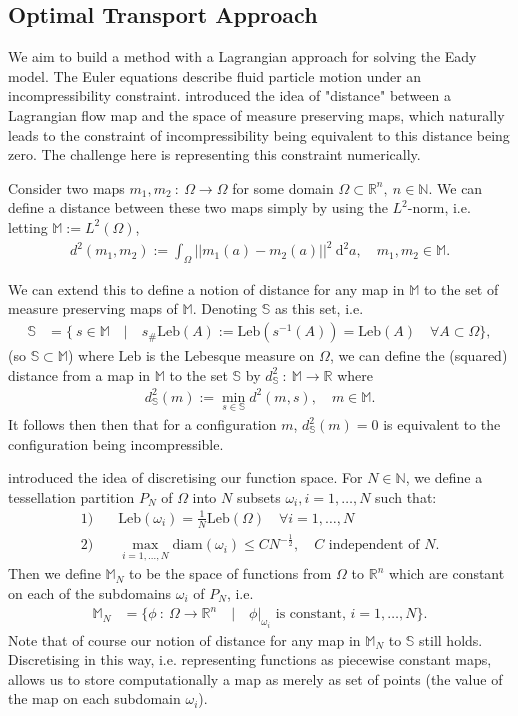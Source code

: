 \documentclass[11pt, oneside]{article}   	%
\newcommand{\R}{\mathbb{R}}
\newcommand{\MN}{\mathbb{M}_N}
\newcommand{\dsmsq}{d^{2}_{\mathbb{S}}(m)}
\newcommand{\M}{\mathbb{M}}
\newcommand{\N}{\mathbb{N}}
\newcommand{\Sb}{\mathbb{S}}
\newcommand{\Leb}{\mathrm{Leb}}
\begin{document}
\subsection{Optimal Transport Approach}

We aim to build a method with a Lagrangian approach for solving the Eady model. The Euler equations describe fluid particle motion under an incompressibility constraint. \cite{brenier1989least} introduced the idea of "distance" between a Lagrangian flow map and the space of measure preserving maps, which naturally leads to the constraint of incompressibility being equivalent to this distance being zero. The challenge here is representing this constraint numerically.

Consider two maps \(m_1, m_2 \: : \: \Omega \to \Omega\) for some domain \(\Omega \subset \R^n, \: n \in \N\). We can define a distance between these two maps simply by using the \(L^2\)-norm, i.e. letting \(\M := L^2(\Omega)\), 
\begin{align}
d^2(m_1, m_2) := \int_\Omega || m_1(a) - m_2(a) ||^2 \: \mathrm{d}^2 a, \quad m_1, m_2 \in \M.
\end{align}

We can extend this to define a notion of distance for any map in \(\M\) to the set of measure preserving maps of \(\M\). Denoting \(\Sb\) as this set, i.e. 
\begin{align}
\Sb &= \{ \: s \in \M \quad | \quad s_{\#}\Leb(A) := \Leb(s^{-1}(A)) = \Leb(A) \quad \forall A \subset \Omega \},
\end{align}
(so \(\Sb \subset \M\)) where \(\Leb\) is the Lebesque measure on \(\Omega\), we can define the (squared) distance from a map in \(\M\) to the set \(\Sb\) by \(d^2_\Sb \: : \: \M \to \R\) where
\begin{align}
\dsmsq := \min_{s \in \mathbb{S}} d^2(m, s), \quad m \in \M.
\end{align}
It follows then then that for a configuration \(m\), \(\dsmsq = 0\) is equivalent to the configuration being incompressible.

\cite{gallouet2016lagrangian} introduced the idea of discretising our function space. For \(N \in \N\), we define a tessellation partition \(P_N\) of \(\Omega\) into \(N\) subsets \(\omega_i, i=1,\dots,N\) such that:
\begin{align}
1)& \quad \Leb(\omega_i) = \frac{1}{N}\Leb(\Omega) \quad \forall i = 1,\dots,N \\
2)& \quad \max_{i = 1,\dots,N} \mathrm{diam}(\omega_i) \le CN^{-\frac{1}{2}}, \quad C \text{ independent of } N.
\end{align}
Then we define \(\MN\) to be the space of functions from \(\Omega\) to \(\R^n\) which are constant on each of the subdomains \(\omega_i\) of \(P_N\), i.e.
\begin{align}
\MN &= \{ \phi \: : \: \Omega \to \R^n \quad | \quad \phi | _{\omega_i} \text{ is constant, } i = 1,\dots,N\}.
\end{align}
Note that of course our notion of distance for any map in \(\MN\) to \(\Sb\) still holds. Discretising in this way, i.e. representing functions as piecewise constant maps, allows us to store computationally a map as merely as set of points (the value of the map on each subdomain \(\omega_i\)).
\end{document}
